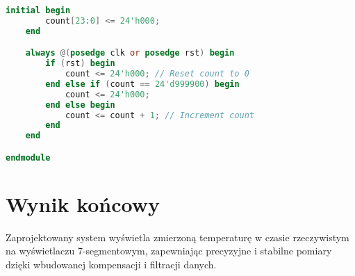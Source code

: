 \documentclass[a4paper,12pt]{article}
\begin{document}
\begin{itemize}
\begin{lstlisting}[language=verilog]
    initial begin
        count[23:0] <= 24'h000;
    end

    always @(posedge clk or posedge rst) begin
        if (rst) begin
            count <= 24'h000; // Reset count to 0
        end else if (count == 24'd999900) begin
            count <= 24'h000;
        end else begin
            count <= count + 1; // Increment count
        end
    end

endmodule
  \end{lstlisting}
\end{itemize}

\section{Wynik końcowy}
Zaprojektowany system wyświetla zmierzoną temperaturę w czasie rzeczywistym na wyświetlaczu 7-segmentowym, zapewniając precyzyjne i stabilne pomiary dzięki wbudowanej kompensacji i filtracji danych.
\end{document}
